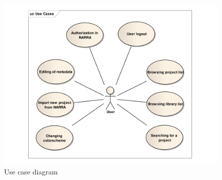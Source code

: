 \documentclass[thesis=B,english]{FITthesis}[2012/10/20]
\begin{document}
	\begin{figure}
		\centering
		\includegraphics[width=1\textwidth]{UseCases.pdf}
		\caption{Use case diagram}\label{fig:usecase}
	\end{figure}
\end{document}
